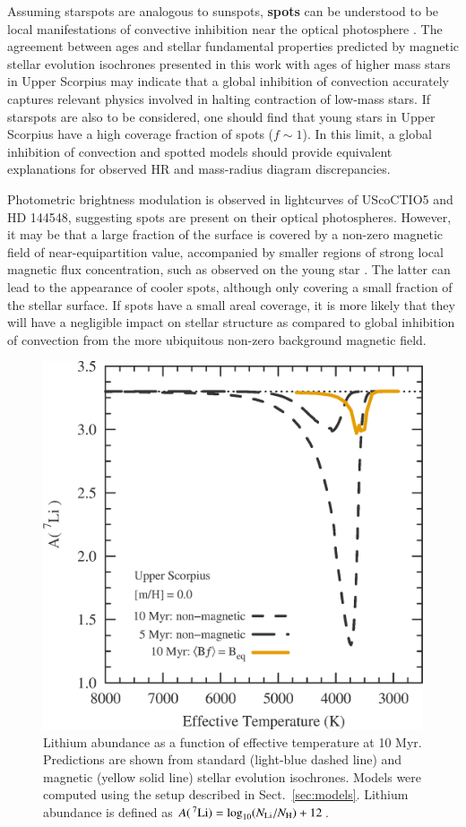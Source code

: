 \documentclass{aa}
\begin{document}
Assuming starspots are analogous to sunspots, {\bf spots} can be understood to be local manifestations of convective inhibition near the optical photosphere \citep{Biermann1941,Deinzer1965}. The agreement between ages and stellar fundamental properties predicted by magnetic stellar evolution isochrones presented in this work with ages of higher mass stars in Upper Scorpius may indicate that a global inhibition of convection accurately captures relevant physics involved in halting contraction of low-mass stars. If starspots are also to be considered, one should find that young stars in Upper Scorpius have a high coverage fraction of spots ($f \sim 1$). In this limit, a global inhibition of convection and spotted models \citep[e.g.,][]{Somers2015b} should provide equivalent explanations for observed HR and mass-radius diagram discrepancies.

Photometric brightness modulation is observed in lightcurves of UScoCTIO5 and HD 144548, suggesting spots are present on their optical photospheres. However, it may be that a large fraction of the surface is covered by a non-zero magnetic field of near-equipartition value, accompanied by smaller regions of strong local magnetic flux concentration, such as observed on the young star  \citep{Shulyak2014}. The latter can lead to the appearance of cooler spots, although only covering a small fraction of the stellar surface. If spots have a small areal coverage, it is more likely that they will have a negligible impact on stellar structure as compared to global inhibition of convection from the more ubiquitous non-zero background magnetic field.

\begin{figure}[t]
    \includegraphics[width=0.85\linewidth]{Li7_USco_Beq.eps}
    \caption{Lithium abundance  as a function of effective temperature at 10 Myr. Predictions are shown from standard (light-blue dashed line) and magnetic (yellow solid line) stellar evolution isochrones. Models were computed using the setup described in Sect.~\ref{sec:models}. Lithium abundance is defined as $A(\,^7{\rm Li}) = \log_{10}(N_{\rm Li}/N_{\rm H}) + 12$.}
    \label{fig:lithium}
\end{figure}
\end{document}
